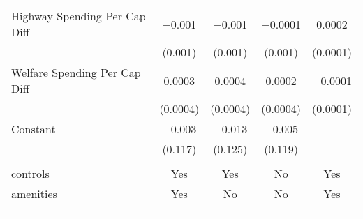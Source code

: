 \begin{table}[!htbp]
\begin{tabular}{@{\extracolsep{5pt}}lcccc}
  Highway Spending Per Cap Diff & $-$0.001 & $-$0.001 & $-$0.0001 & 0.0002 \\ 
  & (0.001) & (0.001) & (0.001) & (0.0001) \\ 
  Welfare Spending Per Cap Diff & 0.0003 & 0.0004 & 0.0002 & $-$0.0001 \\ 
  & (0.0004) & (0.0004) & (0.0004) & (0.0001) \\ 
  Constant & $-$0.003 & $-$0.013 & $-$0.005 &  \\ 
  & (0.117) & (0.125) & (0.119) &  \\ 
 \hline \\[-1.8ex] 
controls & Yes & Yes & No & Yes \\ 
amenities & Yes & No & No & Yes \\ 
\hline \\[-1.8ex] 
\hline 
\hline \\[-1.8ex] 
\end{tabular} 
\end{table} 
